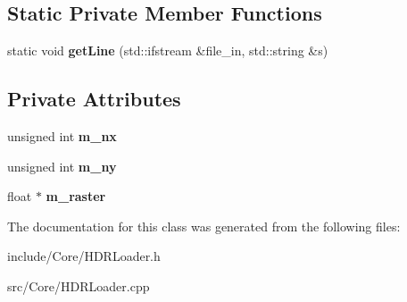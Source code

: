 \subsection*{Static Private Member Functions}
\begin{DoxyCompactItemize}
\item 
\hypertarget{class_h_d_r_loader_a663532db9acaf772c4fc2be0607ced2f}{static void {\bfseries get\-Line} (std\-::ifstream \&file\-\_\-in, std\-::string \&s)}\label{class_h_d_r_loader_a663532db9acaf772c4fc2be0607ced2f}

\end{DoxyCompactItemize}
\subsection*{Private Attributes}
\begin{DoxyCompactItemize}
\item 
\hypertarget{class_h_d_r_loader_af369873a0c721da0b84b39e7a97486b4}{unsigned int {\bfseries m\-\_\-nx}}\label{class_h_d_r_loader_af369873a0c721da0b84b39e7a97486b4}

\item 
\hypertarget{class_h_d_r_loader_acc899f9e422fbb4f550ee9aa86521ba9}{unsigned int {\bfseries m\-\_\-ny}}\label{class_h_d_r_loader_acc899f9e422fbb4f550ee9aa86521ba9}

\item 
\hypertarget{class_h_d_r_loader_ab4b7b0ab50869b6bacffc490e3454cdc}{float $\ast$ {\bfseries m\-\_\-raster}}\label{class_h_d_r_loader_ab4b7b0ab50869b6bacffc490e3454cdc}

\end{DoxyCompactItemize}


The documentation for this class was generated from the following files\-:\begin{DoxyCompactItemize}
\item 
include/\-Core/H\-D\-R\-Loader.\-h\item 
src/\-Core/H\-D\-R\-Loader.\-cpp\end{DoxyCompactItemize}
